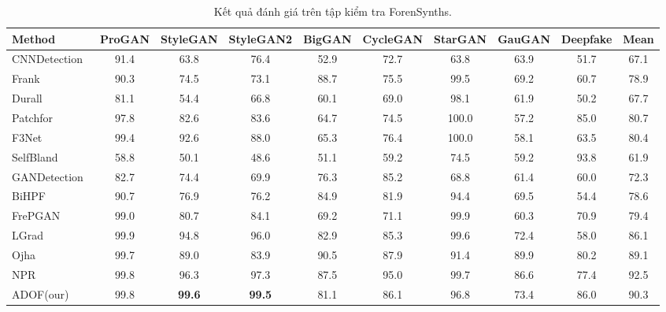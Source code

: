 \begin{table}[h]%
\scriptsize 
\centering
\renewcommand{\arraystretch}{1.2} %
\caption{Kết quả đánh giá trên tập kiểm tra ForenSynths.}
\label{tab:table1}
\begin{adjustbox}{max width=\textwidth}
\begin{tabular}{|l| cc cc cc cc| c|}
\hline
\multirow{1}{*}{\textbf{Method}} & \multicolumn{1}{c}{\textbf{ProGAN}} & \multicolumn{1}{c}{\textbf{StyleGAN}} & \multicolumn{1}{c}{\textbf{StyleGAN2}} & \multicolumn{1}{c}{\textbf{BigGAN}} & \multicolumn{1}{c}{\textbf{CycleGAN}} & \multicolumn{1}{c}{\textbf{StarGAN}} & \multicolumn{1}{c}{\textbf{GauGAN}} & \multicolumn{1}{c|}{\textbf{Deepfake}} & \multicolumn{1}{c|}{\textbf{Mean}} \\ 
\hline
CNNDetection~\cite{Wang2019CNNGeneratedIA} & 91.4 & 63.8 & 76.4 & 52.9 & 72.7 & 63.8 & 63.9  & 51.7 & 67.1 \\ 
Frank~\cite{Frank2020LeveragingFA} & 90.3 & 74.5 & 73.1 & 88.7 & 75.5 & 99.5 		& 69.2   & 60.7 & 78.9  \\ 
Durall~\cite{Durall2020WatchYU} & 81.1 & 54.4 & 66.8 & 60.1 & 69.0 & 98.1    		& 61.9 & 50.2 & 67.7  \\ 
Patchfor~\cite{Chai2020WhatMF} & 97.8 & 82.6 & 83.6 & 64.7 & 74.5 & 100.0    		& 57.2  & 85.0 & 80.7  \\ 
F3Net~\cite{Qian2020ThinkingIF} & 99.4 & 92.6 & 88.0 & 65.3 & 76.4 & 100.0  		& 58.1  & 63.5 & 80.4 \\ 
SelfBland~\cite{Shiohara2022DetectingDW} & 58.8 & 50.1 & 48.6 & 51.1 & 59.2 & 74.5    & 59.2   & 93.8 & 61.9\\ 
GANDetection~\cite{Mandelli2022DetectingGI} & 82.7 & 74.4 & 69.9 & 76.3 & 85.2 & 68.8 & 61.4   & 60.0 & 72.3  \\ 
BiHPF~\cite{Jeong2021BiHPFBH} & 90.7 & 76.9 & 76.2 & 84.9 & 81.9 & 94.4 			  & 69.5  & 54.4 & 78.6 \\ 
FrePGAN~\cite{Jeong2022FrePGANRD} & 99.0 & 80.7 & 84.1 & 69.2 & 71.1 & 99.9  		  & 60.3  & 70.9 & 79.4 \\ 
LGrad~\cite{Tan2023LearningOG} & 99.9 & 94.8 & 96.0 & 82.9 & 85.3 & 99.6  & 72.4  & 58.0 & 86.1 \\ 
Ojha~\cite{Ojha2023TowardsUF} & 99.7 & 89.0 & 83.9 & 90.5 & 87.9 & 91.4   & 89.9  & 80.2 & 89.1 \\ 
NPR~\cite{Tan2023RethinkingTU} & 99.8 & 96.3 & 97.3 & 87.5 & 95.0 & 99.7  & 86.6  & 77.4 & 92.5 \\ 
{ADOF(our)} & 99.8 & \textbf{99.6} & \textbf{99.5} & 81.1 & 86.1 & 96.8   & 73.4  & 86.0 & 90.3  \\ 
\hline
\end{tabular}
\end{adjustbox}
\end{table}





